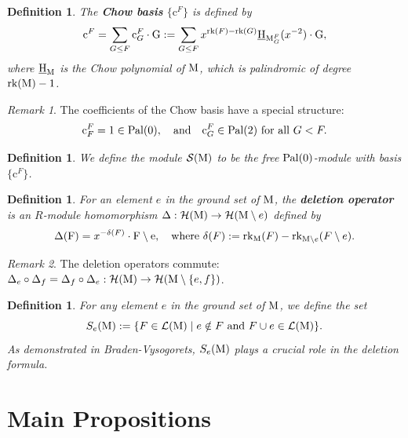 \documentclass[11pt]{article}
\newcommand{\calH}{\mathcal{H}}
\newcommand{\calS}{\mathcal{S}}
\newcommand{\chow}{\normalfont\text{\underline{H}}}
\newcommand{\rank}{\normalfont\text{rk}}
\newcommand{\M}{\normalfont\text{M}}
\newcommand{\Ebasis}[1]{\mathrm{#1}}
\newcommand{\Cbasis}[1]{\mathrm{c}^{#1}}
\newcommand{\CbasisSub}[2]{\mathrm{c}^{#1}_{#2}}
\newcommand{\pal}{\normalfont\text{Pal}}
\newtheorem{definition}[theorem]{Definition}
\theoremstyle{remark}
\newtheorem*{remark}{Remark} %
\begin{document}
\begin{definition}
    The \textbf{Chow basis} \(\{\Cbasis{F}\}\) is defined by
    \[
        \Cbasis{F} = \sum_{G\le F} \CbasisSub{F}{G}\cdot\Ebasis{G} :=
        \sum_{G \le F} x^{\rank(F)-\rank(G)} \chow_{\M_G^F}(x^{-2}) \cdot \Ebasis{G},
    \]
    where \(\chow_{\M}\) is the Chow polynomial of \(\M\), which is palindromic of degree \(\rank(\M)-1\).
\end{definition}

\begin{remark}
    The coefficients of the Chow basis have a special structure:
    \[\CbasisSub{F}{F} = 1 \in \pal(0),\quad\text{and}\quad\CbasisSub{F}{G} \in \pal(2)\ \text{for all}\ G < F.\]
\end{remark}
\begin{definition}
    We define the module \(\calS(\M)\) to be the free \(\pal(0)\)-module with basis \(\{\Cbasis{F}\}\).
\end{definition}

\begin{definition}
    For an element \(e\) in the ground set of \(\M\), the \textbf{deletion operator} is an \(R\)-module homomorphism \(\Delta : \calH(\M) \to \calH(\M \setminus e)\) defined by
    \[ \Delta(\Ebasis{F}) = x^{-\delta(F)}\cdot \Ebasis{F \setminus e}, \quad \text{where } \delta(F) := \rank_{\M}(F) - \rank_{\M\setminus e}(F \setminus e).\]
\end{definition}
\begin{remark}
    The deletion operators commute: \(\Delta_e \circ \Delta_f = \Delta_f \circ \Delta_e:
    \calH(\M) \to \calH(\M \setminus \{e,f\})\).
\end{remark}

\begin{definition}
    For any element \(e\) in the ground set of \(\M\), we define the set
    \[ S_e(\M) := \{ F \in \mathcal{L}(\M) \mid e \notin F \text{ and } F\cup e \in \mathcal{L}(\M) \}. \]
    As demonstrated in Braden-Vysogorets, \(S_e(\M)\) plays a crucial role in the deletion formula.
\end{definition}

\section{Main Propositions}
\end{document}
